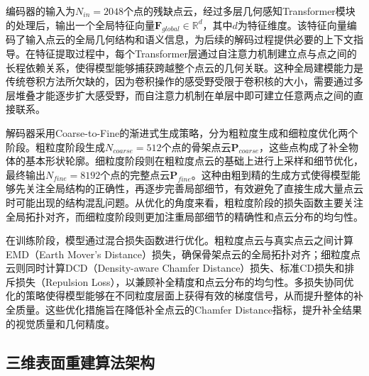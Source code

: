 编码器的输入为$N_{in}=2048$个点的残缺点云，经过多层几何感知Transformer模块的处理后，输出一个全局特征向量$\mathbf{F}_{global} \in \mathbb{R}^{d}$，其中$d$为特征维度。该特征向量编码了输入点云的全局几何结构和语义信息，为后续的解码过程提供必要的上下文指导。在特征提取过程中，每个Transformer层通过自注意力机制建立点与点之间的长程依赖关系，使得模型能够捕获跨越整个点云的几何关联。这种全局建模能力是传统卷积方法所欠缺的，因为卷积操作的感受野受限于卷积核的大小，需要通过多层堆叠才能逐步扩大感受野，而自注意力机制在单层中即可建立任意两点之间的直接联系。

解码器采用Coarse-to-Fine的渐进式生成策略，分为粗粒度生成和细粒度优化两个阶段。粗粒度阶段生成$N_{coarse}=512$个点的骨架点云$\mathbf{P}_{coarse}$，这些点构成了补全物体的基本形状轮廓。细粒度阶段则在粗粒度点云的基础上进行上采样和细节优化，最终输出$N_{fine}=8192$个点的完整点云$\mathbf{P}_{fine}$。这种由粗到精的生成方式使得模型能够先关注全局结构的正确性，再逐步完善局部细节，有效避免了直接生成大量点云时可能出现的结构混乱问题。从优化的角度来看，粗粒度阶段的损失函数主要关注全局拓扑对齐，而细粒度阶段则更加注重局部细节的精确性和点云分布的均匀性。

在训练阶段，模型通过混合损失函数进行优化。粗粒度点云与真实点云之间计算EMD（Earth Mover's Distance）损失，确保骨架点云的全局拓扑对齐；细粒度点云则同时计算DCD（Density-aware Chamfer Distance）损失、标准CD损失和排斥损失（Repulsion Loss），以兼顾补全精度和点云分布的均匀性。多损失协同优化的策略使得模型能够在不同粒度层面上获得有效的梯度信号，从而提升整体的补全质量。这些优化措施旨在降低补全点云的Chamfer Distance指标，提升补全结果的视觉质量和几何精度。

\subsection{三维表面重建算法架构}

